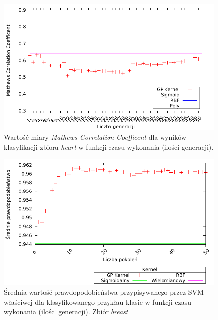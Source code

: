 	\begin{figure}
		\includegraphics[scale=0.90]{figures/results/mcc/mcc-heart}
		\caption{Wartość miary \emph{Mathews Correlation Coefficent} dla wyników klasyfikacji zbioru \emph{heart} w funkcji czasu wykonania (ilości generacji).\label{fig:mcc-heart}}
	\end{figure}
	
	\begin{figure}
		\includegraphics[scale=0.90]{figures/results/probability/probability-breast}
		\caption{Średnia wartość prawdopodobieństwa przypisywanego przez SVM właściwej dla klasyfikowanego przykłau klasie w funkcji czasu wykonania (ilości generacji). Zbiór \emph{breast}\label{fig:probability-breast}}
	\end{figure}
	

